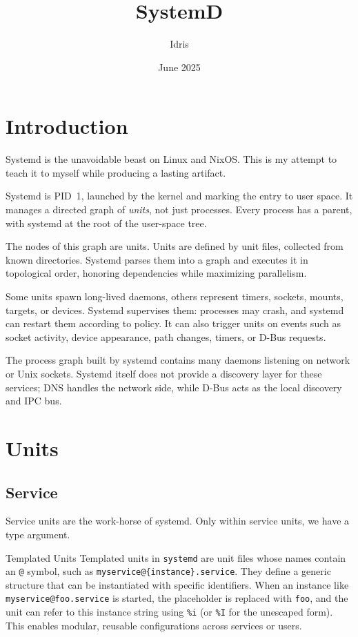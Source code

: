 \documentclass[openany, 12pt]{book}
\title{SystemD}
\author{Idris}
\date{June 2025}
\begin{document}
\tableofcontents

\frontmatter
\chapter{Introduction}
Systemd is the unavoidable beast on Linux and NixOS. This is my attempt to
teach it to myself while producing a lasting artifact.

Systemd is PID~1, launched by the kernel and marking the entry to user space.
It manages a directed graph of \emph{units}, not just processes. Every process
has a parent, with systemd at the root of the user-space tree.

The nodes of this graph are units. Units are defined by unit files, collected
from known directories. Systemd parses them into a graph and executes it in
topological order, honoring dependencies while maximizing parallelism.

Some units spawn long-lived daemons, others represent timers, sockets, mounts,
targets, or devices. Systemd supervises them: processes may crash, and systemd
can restart them according to policy. It can also trigger units on events such
as socket activity, device appearance, path changes, timers, or D-Bus requests.

The process graph built by systemd contains many daemons listening on network
or Unix sockets. Systemd itself does not provide a discovery layer for these
services; DNS handles the network side, while D-Bus acts as the local discovery
and IPC bus.


\mainmatter
\chapter{Units}
\section{Service}
Service units are the work-horse of systemd. Only within service units, we have
a type argument.

\begin{definition}{Templated Units}{}
  Templated units in \texttt{systemd} are unit files whose names contain an
  \texttt{@} symbol, such as \texttt{myservice@\{instance\}.service}. They define
  a generic structure that can be instantiated with specific identifiers. When an
  instance like \texttt{myservice@foo.service} is started, the placeholder is
  replaced with \texttt{foo}, and the unit can refer to this instance string using
  \texttt{\%i} (or \texttt{\%I} for the unescaped form). This enables modular,
  reusable configurations across services or users.
\end{definition}
\end{document}
